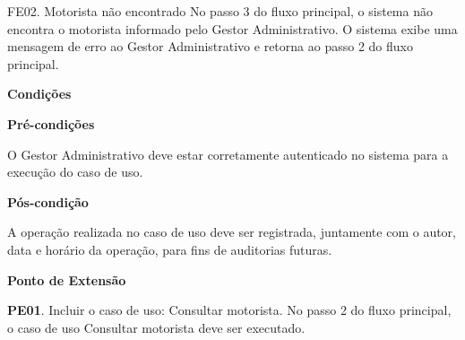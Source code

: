     FE02. Motorista não encontrado
	No passo 3 do fluxo principal, o sistema não encontra o motorista informado pelo Gestor Administrativo. O sistema exibe uma
	mensagem de erro ao Gestor Administrativo e retorna ao passo 2 do fluxo principal.

	
   {\raggedright
      \textbf{Condições}
   }
   
    
   \textbf{Pré-condições}
   
   O Gestor Administrativo deve estar corretamente autenticado no sistema para a execução do caso de uso.
   
   \textbf{Pós-condição}
   
   A operação realizada no caso de uso deve ser registrada, juntamente com o autor, data e horário da operação, para fins de auditorias futuras.


   {\raggedright
      \textbf{Ponto de Extensão}
   }
   
   
    \textbf{PE01}. Incluir o caso de uso: Consultar motorista.
	    No passo 2 do fluxo principal, o caso de uso Consultar motorista deve ser executado.
   


  